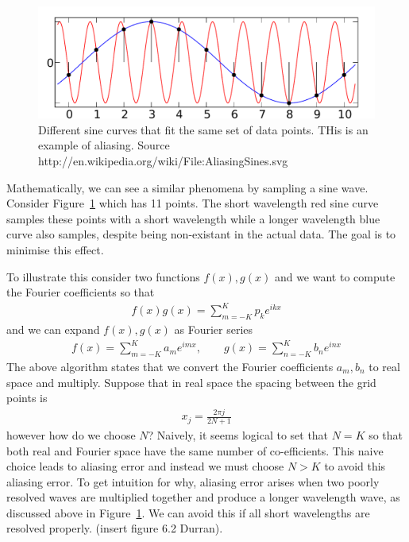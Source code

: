 \begin{figure}
\begin{center}
\includegraphics[width=\textwidth]{aliassine.pdf}
\caption{Different sine curves that fit the same set of data points. THis is an example of aliasing. Source http://en.wikipedia.org/wiki/File:AliasingSines.svg}
\end{center}
\label{aliassine}
\end{figure}
Mathematically, we can see a similar phenomena by sampling a sine wave. Consider Figure~\ref{aliassine} which has 11 points. The short wavelength red sine curve samples these points with a short wavelength while a longer wavelength blue curve also samples, despite being non-existant in the actual data. The goal is to minimise this effect. 

To illustrate this consider two functions $f(x),g(x)$ and we want to compute the Fourier coefficients so that
\begin{align}
f(x)g(x) = \sum_{m=-K}^{K} p_{k}e^{ikx}
\end{align}
and we can expand $f(x),g(x)$ as Fourier series
\begin{align}
f(x) = \sum_{m=-K}^{K}a_{m}e^{imx}, \qquad g(x) = \sum_{n=-K}^{K}b_{n}e^{inx}
\end{align}
The above algorithm states that we convert the Fourier coefficients $a_{m},b_{n}$ to real space and multiply. Suppose that in real space the spacing between the grid points is
\begin{align}
x_{j} = \frac{2\pi j}{2N+1}
\end{align}
however how do we choose $N$? Naively, it seems logical to set that $N=K$ so that both real and Fourier space have the same number of co-efficients. This naive choice leads to aliasing error and instead we must choose $N>K$ to avoid this aliasing error. To get intuition for why, aliasing error arises when two poorly resolved waves are multiplied together and produce a longer wavelength wave, as discussed above in Figure~\ref{aliassine}. We can avoid this if all short wavelengths are resolved properly. (insert figure 6.2 Durran).

